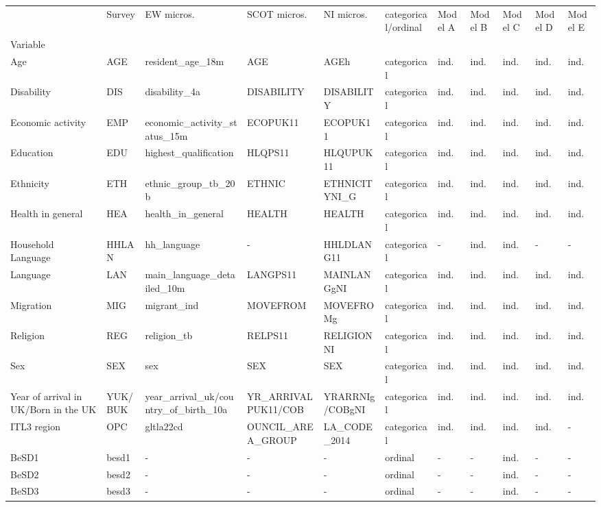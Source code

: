 \begin{tabular}{lllllllllll}
\toprule
 & Survey & EW micros. & SCOT micros. & NI micros. & categorical/ordinal & Model A & Model B & Model C & Model D & Model E \\
Variable &  &  &  &  &  &  &  &  &  &  \\
\midrule
Age & AGE & resident\_age\_18m & AGE & AGEh & categorical & ind. & ind. & ind. & ind. & ind. \\
Disability & DIS & disability\_4a & DISABILITY & DISABILITY & categorical & ind. & ind. & ind. & ind. & ind. \\
Economic activity & EMP & economic\_activity\_status\_15m & ECOPUK11 & ECOPUK11 & categorical & ind. & ind. & ind. & ind. & ind. \\
Education & EDU & highest\_qualification & HLQPS11 & HLQUPUK11 & categorical & ind. & ind. & ind. & ind. & ind. \\
Ethnicity & ETH & ethnic\_group\_tb\_20b & ETHNIC & ETHNICITYNI\_G & categorical & ind. & ind. & ind. & ind. & ind. \\
Health in general & HEA & health\_in\_general & HEALTH & HEALTH & categorical & ind. & ind. & ind. & ind. & ind. \\
Household Language & HHLAN & hh\_language & - & HHLDLANG11 & categorical & - & ind. & ind. & - & - \\
Language & LAN & main\_language\_detailed\_10m & LANGPS11 & MAINLANGgNI & categorical & ind. & ind. & ind. & ind. & ind. \\
Migration & MIG & migrant\_ind & MOVEFROM & MOVEFROMg & categorical & ind. & ind. & ind. & ind. & ind. \\
Religion & REG & religion\_tb & RELPS11 & RELIGIONNI & categorical & ind. & ind. & ind. & ind. & ind. \\
Sex & SEX & sex & SEX & SEX & categorical & ind. & ind. & ind. & ind. & ind. \\
Year of arrival in UK/Born in the UK & YUK/BUK & year\_arrival\_uk/country\_of\_birth\_10a & YR\_ARRIVALPUK11/COB & YRARRNIg/COBgNI & categorical & ind. & ind. & ind. & ind. & ind. \\
ITL3 region & OPC & gltla22cd & OUNCIL\_AREA\_GROUP & LA\_CODE\_2014 & categorical & ind. & ind. & ind. & ind. & - \\
BeSD1 & besd1 & - & - & - & ordinal & - & - & ind. & - & - \\
BeSD2 & besd2 & - & - & - & ordinal & - & - & ind. & - & - \\
BeSD3 & besd3 & - & - & - & ordinal & - & - & ind. & - & - \\

\end{tabular}
